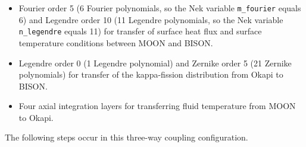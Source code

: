 \documentclass[10pt]{article}
\numberwithin{equation}{section} %
\begin{document}
\begin{itemize}
\item Fourier order 5 (6 Fourier polynomials, so the Nek variable {\tt m\_fourier} equals 6) and Legendre order 10 (11 Legendre polynomials, so the Nek variable {\tt n\_legendre} equals 11) for transfer of surface heat flux and surface temperature conditions between MOON and BISON.
\item Legendre order 0 (1 Legendre polynomial) and Zernike order 5 (21 Zernike polynomials) for transfer of the kappa-fission distribution from Okapi to BISON.
\item Four axial integration layers for transferring fluid temperature from MOON to Okapi.
\end{itemize}

The following steps occur in this three-way coupling configuration.
\end{document}
